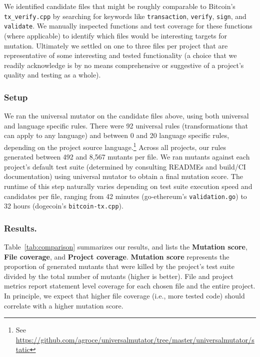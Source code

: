 We identified candidate files that might be roughly comparable to
Bitcoin's {\tt tx\_verify.cpp} by searching for keywords like \texttt{transaction},
\texttt{verify}, \texttt{sign}, and \texttt{validate}. We manually inspected
functions and test coverage for these functions (where applicable) to identify
which files would be interesting targets for mutation. Ultimately we
settled on one to three files per project that are representative of some
interesting and tested functionality (a choice that we readily acknowledge is by
no means comprehensive or suggestive of a project's quality and testing as a
whole).

\subsubsection*{Setup}
We ran the universal mutator on the candidate files above, using both universal and
language specific rules. There were 92 universal rules (transformations that can apply to
any language) and between 0 and 20 language specific rules, depending on the project source language.\footnote{See \url{https://github.com/agroce/universalmutator/tree/master/universalmutator/static}}
Across all projects, our rules generated between 492 and 8,567 mutants per file.
We ran mutants against each project's default test suite (determined by consulting READMEs and build/CI documentation) using universal mutator to obtain a final mutation score. The runtime
of this step naturally varies depending on test suite execution speed and candidates per file, ranging from
42 minutes (go-ethereum's {\tt validation.go}) to 32 hours (dogecoin's
{\tt bitcoin-tx.cpp}).

\subsubsection*{Results.}
Table~\ref{tab:comparison} summarizes our results, and lists the
\textbf{Mutation score}, \textbf{File coverage}, and \textbf{Project coverage}. \textbf{Mutation score} represents the proportion of
generated mutants that were killed by the project's test suite divided by the total number
of mutants (higher is better). File and project metrics report statement level coverage
for each chosen file and the entire project. In principle, we expect that higher file coverage
(i.e., more tested code) should correlate with a higher mutation
score.

